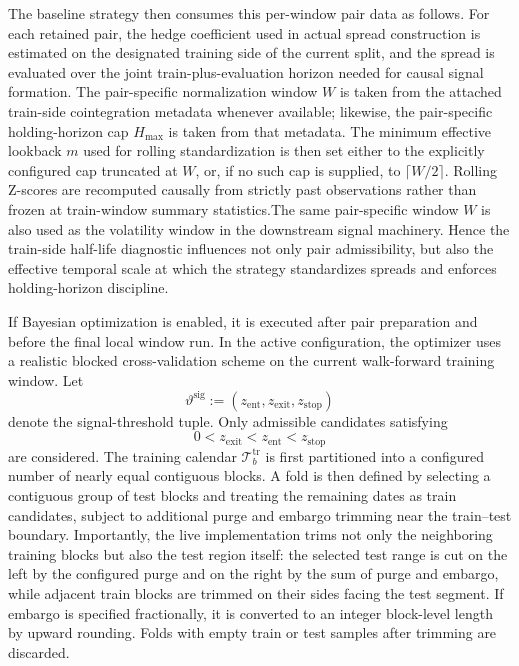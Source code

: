 \documentclass[11pt,a4paper]{article}
\begin{document}
The baseline strategy then consumes this per-window pair data as follows. For
each retained pair, the hedge coefficient used in actual spread construction is
estimated on the designated training side of the current split, and the spread
is evaluated over the joint train-plus-evaluation horizon needed for causal
signal formation. The pair-specific normalization window \(W\) is taken from the
attached train-side cointegration metadata whenever available; likewise, the
pair-specific holding-horizon cap \(H_{\max}\) is taken from that metadata.
The minimum effective lookback \(m\) used for rolling standardization is then
set either to the explicitly configured cap truncated at \(W\), or, if no such
cap is supplied, to \(\lceil W/2\rceil\). Rolling Z-scores are recomputed causally from
strictly past observations rather than frozen at train-window summary
statistics.The same pair-specific
window \(W\) is also used as the volatility window in the downstream signal
machinery. Hence the train-side half-life diagnostic influences not only pair
admissibility, but also the effective temporal scale at which the strategy
standardizes spreads and enforces holding-horizon discipline.

If Bayesian optimization is enabled, it is executed after pair preparation and
before the final local window run. In the active configuration, the optimizer
uses a realistic blocked cross-validation scheme on the current walk-forward
training window. Let
\[
  \vartheta^{\mathrm{sig}}
  :=
  (z_{\mathrm{ent}}, z_{\mathrm{exit}}, z_{\mathrm{stop}})
\]
denote the signal-threshold tuple. Only admissible candidates satisfying
\[
  0 < z_{\mathrm{exit}} < z_{\mathrm{ent}} < z_{\mathrm{stop}}
\]
are considered. The training calendar \(\mathcal T_b^{\mathrm{tr}}\) is first
partitioned into a configured number of nearly equal contiguous blocks. A fold
is then defined by selecting a contiguous group of test blocks and treating the
remaining dates as train candidates, subject to additional purge and embargo
trimming near the train--test boundary. Importantly, the live implementation
trims not only the neighboring training blocks but also the test region itself:
the selected test range is cut on the left by the configured purge and on the
right by the sum of purge and embargo, while adjacent train blocks are trimmed
on their sides facing the test segment. If embargo is specified fractionally,
it is converted to an integer block-level length by upward rounding. Folds with
empty train or test samples after trimming are discarded.
\end{document}
